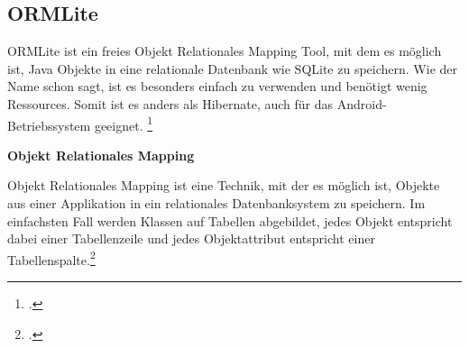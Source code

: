 
\subsection{ORMLite}
ORMLite ist ein freies Objekt Relationales Mapping Tool, mit dem es möglich ist, Java Objekte in eine relationale Datenbank wie SQLite zu speichern. Wie der Name schon sagt, ist es besonders einfach zu verwenden und benötigt wenig Ressources. Somit ist es anders als Hibernate,  auch für das Android-Betriebssystem geeignet.  \footcite[vgl.][]{ORMLite}


\textbf{Objekt Relationales Mapping}

Objekt Relationales Mapping ist eine Technik, mit der es möglich ist, Objekte aus einer Applikation in ein relationales Datenbanksystem zu speichern. 
Im einfachsten Fall werden Klassen auf Tabellen abgebildet, jedes Objekt entspricht dabei einer Tabellenzeile und jedes Objektattribut entspricht einer Tabellenspalte.\footcite[vgl.][]{orm}

